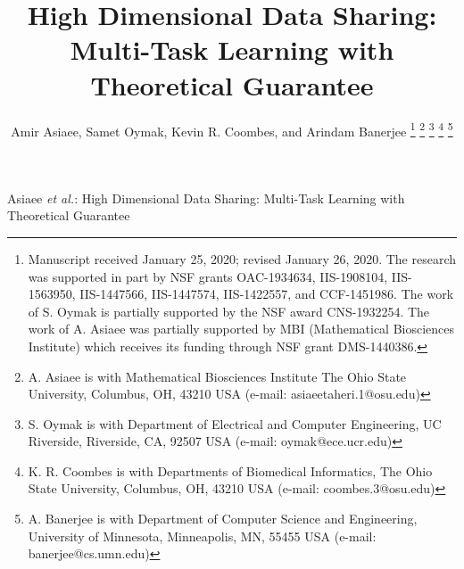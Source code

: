 \title{High Dimensional Data Sharing: \\ Multi-Task Learning with Theoretical Guarantee}


\author{Amir Asiaee,
        Samet Oymak,
        Kevin R. Coombes, 
        and Arindam Banerjee%
\thanks{Manuscript received January 25, 2020; revised January 26, 2020. The research was supported in part by NSF grants OAC-1934634, IIS-1908104, IIS-1563950, IIS-1447566, IIS-1447574, IIS-1422557, and CCF-1451986. The work of S. Oymak is partially supported by the NSF award CNS-1932254. The work of A. Asiaee was partially supported by MBI (Mathematical Biosciences Institute) which receives its funding through NSF grant DMS-1440386.}
\thanks{A. Asiaee is with Mathematical Biosciences Institute The Ohio State University, Columbus, OH, 43210 USA (e-mail: asiaeetaheri.1@osu.edu)}	
\thanks{S. Oymak is with Department of Electrical and Computer Engineering, UC Riverside, Riverside, CA, 92507 USA (e-mail: oymak@ece.ucr.edu)}	
\thanks{K. R. Coombes is with Departments of Biomedical Informatics, The Ohio State University, Columbus, OH, 43210 USA (e-mail: coombes.3@osu.edu)}	
\thanks{A. Banerjee is with Department of Computer Science and Engineering, University of Minnesota, Minneapolis, MN, 55455 USA (e-mail: banerjee@cs.umn.edu)}		
 }


{Asiaee \MakeLowercase{\textit{et al.}}: High Dimensional Data Sharing: Multi-Task Learning with Theoretical Guarantee}


